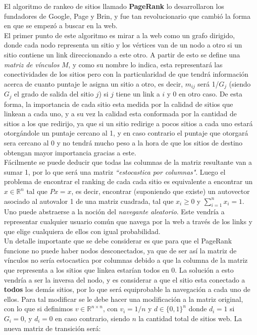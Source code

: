 El algoritmo de rankeo de sitios  llamado \textbf{PageRank} lo desarrollaron los fundadores de Google, Page y Brin, y fue tan revolucionario que cambió la forma en que se empezó a buscar en la web. \\
El primer punto de este algoritmo es mirar a la web como un grafo dirigido, donde cada nodo representa un sitio y los vértices van de un nodo a otro si un sitio contiene un link direccionando a este otro.
A partir de esto se define una \emph{matriz de vínculos} $M$, y como su nombre lo indica, esta representará las conectividades de los sitios pero con la particularidad de que tendrá información acerca de cuanto puntaje le asigna un sitio a otro, es decir, $m_{ij}$ será 1/$G_j$  (siendo $G_j$ el grado de salida del sitio $j$) si $j$ tiene un link a $i$ y 0 en otro caso.
De esta forma, la importancia de cada sitio esta medida por la calidad de sitios que linkean a cada uno, y a su vez la calidad esta conformada por la cantidad de sitios a los que redirijo, ya que si un sitio redirige a pocos sitios a cada uno estará otorgándole un puntaje cercano al 1, y en caso contrario el puntaje que otorgará sera cercano al 0 y no tendrá mucho peso a la hora de que los sitios de destino obtengan mayor importancia gracias a este.\\
Fácilmente se puede deducir que todas las columnas de la matriz resultante van a sumar 1, por lo que será una matriz \textit{``estocastica por columnas"}. Luego el problema de encontrar el ranking de cada cada sitio es equivalente a encontrar un $x\in \mathbb{R}^n$ tal que $Px = x$, es decir, encontrar (suponiendo que existe) un autovector asociado al autovalor 1 de una matriz cuadrada, tal que $x_i \ge
0$ y $\sum_{i = 1}^n x_i = 1$. 
\\
Uno puede abstraerse a la noción del \emph{navegante aleatorio}. Este vendría a representar cualquier usuario común que navega por la web a través de los links y que elige cualquiera de ellos con igual probabilidad.
\\
Un detalle importante que se debe considerar es que para que el PageRank funcione no puede haber nodos desconectados, ya que de ser así la matriz de vínculos no sería estocastica por columnas debido a que la columna de la matriz que representa a los sitios que linkea estarían todos en 0. La solución a esto vendría a ser la inversa del nodo, y es considerar a que el sitio esta conectado a \textbf{todos} los demás sitios, por lo que será equiprobable la navegación a cada uno de ellos. Para tal modificar se le debe hacer una modificación a la matriz original, con lo que si definimos $v \in \mathbb{R}^{n \times n}$, con $v_i = 1/n$ y $d \in \{0,1\}^{n}$ donde 
$d_i = 1$ si $G_i = 0$, y $d_i = 0$ en caso contrario, siendo $n$ la cantidad total de sitios web. La nueva matriz de transici\'on será:


